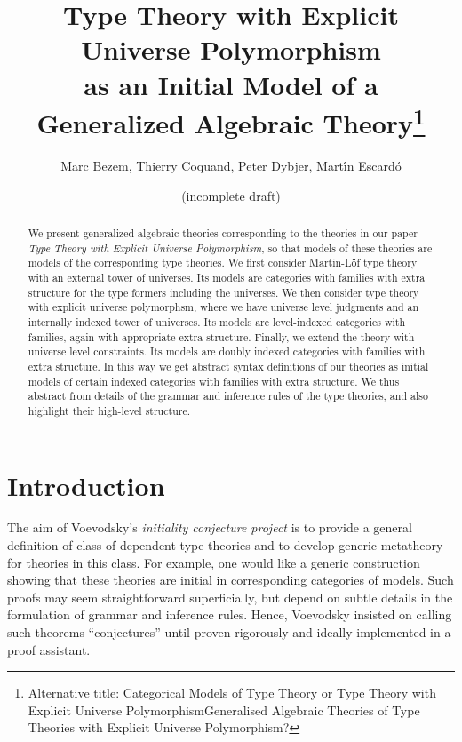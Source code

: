 \documentclass[11pt,a4paper]{article}
\theoremstyle{definition}
\begin{document}
\title{Type Theory
with Explicit Universe Polymorphism\\ as an Initial Model of a Generalized Algebraic Theory\footnote{Alternative title: Categorical Models of Type Theory or Type Theory
with Explicit Universe PolymorphismGeneralised Algebraic Theories of Type Theories with Explicit Universe Polymorphism?
}}

\author{Marc Bezem, Thierry Coquand, Peter Dybjer, Mart\'{\i}n Escard\'o}

\date{(incomplete draft)}
\maketitle

\begin{abstract}
We present generalized algebraic theories corresponding to the theories in our paper 
{\em Type Theory with Explicit Universe Polymorphism}, so that models of these theories are models of the corresponding type theories. We first consider Martin-Löf type theory with an external tower of universes. Its models are categories with families with extra structure for the type formers including the universes. We then consider type theory with explicit universe polymorphsm, where we have universe level judgments and an internally indexed tower of universes. Its models are level-indexed categories with families, again with appropriate extra structure. Finally, we extend the theory with universe level constraints. Its models are doubly indexed categories with families with extra structure. In this way we get abstract syntax definitions of our theories as initial models of certain indexed categories with families with extra structure. We thus abstract from details of the grammar and inference rules of the type theories, and also highlight their high-level structure.
\end{abstract}

\section{Introduction}

The aim of Voevodsky's {\em initiality conjecture project} \cite{voevodsky:initiality} is to provide a general definition of class of dependent type theories and to develop generic metatheory for theories in this class. For example, one would like a generic construction showing that these theories are initial in corresponding categories of models. Such proofs may seem straightforward superficially, but depend on subtle details in the formulation of grammar and inference rules. Hence, Voevodsky insisted on calling such theorems ``conjectures'' until proven rigorously and ideally implemented in a proof assistant.
\end{document}
